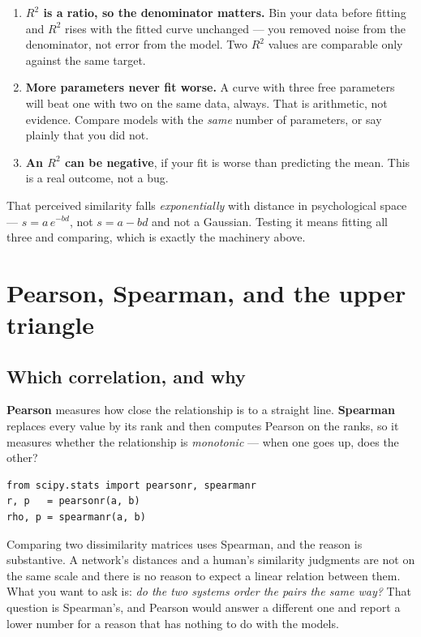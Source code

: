 \documentclass[11pt]{article}
\begin{document}
\begin{enumerate}
  \item \textbf{$R^2$ is a ratio, so the denominator matters.} Bin your data
        before fitting and $R^2$ rises with the fitted curve unchanged --- you
        removed noise from the denominator, not error from the model. Two $R^2$
        values are comparable only against the same target.
  \item \textbf{More parameters never fit worse.} A curve with three free
        parameters will beat one with two on the same data, always. That is
        arithmetic, not evidence. Compare models with the \emph{same} number of
        parameters, or say plainly that you did not.
  \item \textbf{An $R^2$ can be negative}, if your fit is worse than predicting
        the mean. This is a real outcome, not a bug.
\end{enumerate}

\begin{keybox}
 That perceived similarity falls
\emph{exponentially} with distance in psychological space --- $s = a\,e^{-bd}$,
not $s = a - bd$ and not a Gaussian. Testing it means fitting all three and
comparing, which is exactly the machinery above.
\end{keybox}

\section{Pearson, Spearman, and the upper triangle}

\subsection{Which correlation, and why}

\textbf{Pearson} measures how close the relationship is to a straight line.
\textbf{Spearman} replaces every value by its rank and then computes Pearson on
the ranks, so it measures whether the relationship is \emph{monotonic} --- when
one goes up, does the other?

\begin{lstlisting}
from scipy.stats import pearsonr, spearmanr
r, p   = pearsonr(a, b)
rho, p = spearmanr(a, b)
\end{lstlisting}

Comparing two dissimilarity matrices uses Spearman, and the reason is
substantive. A network's distances and a human's similarity judgments are not
on the same scale and there is no reason to expect a linear relation between
them. What you want to ask is: \emph{do the two systems order the pairs the same
way?} That question is Spearman's, and Pearson would answer a different one and
report a lower number for a reason that has nothing to do with the models.
\end{document}
